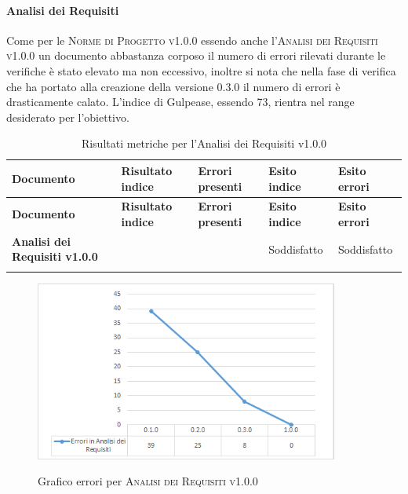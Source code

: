 \documentclass[../piano-di-qualifica.tex]{subfiles}
\begin{document}
\paragraph{Analisi dei Requisiti}
\label{sub:analisi_dei_requisiti}
Come per le \textsc{Norme di Progetto v1.0.0} essendo anche l'\textsc{Analisi dei Requisiti v1.0.0} un documento abbastanza corposo il numero di errori rilevati durante le verifiche è stato elevato ma non eccessivo, inoltre si nota che nella fase di verifica che ha portato alla creazione della versione 0.3.0 il numero di errori è drasticamente calato. 
L'indice di Gulpease, essendo 73, rientra nel range desiderato per l'obiettivo.

\renewcommand{\arraystretch}{2} %
\begin{longtable}[H]{>{\centering\bfseries}m{6cm} >{\centering}m{2cm} >{\centering}m{2.5cm} >{\centering}m{2.5cm} >{\centering\arraybackslash}m{2.5cm}}  
  \rowcolor{lightgray}
  {\textbf{Documento}} & {\textbf{Risultato indice}} & {\textbf{Errori presenti}} & {\textbf{Esito indice}} & {\textbf{Esito errori}}  \\
  \endfirsthead%
  \rowcolor{lightgray}
  {\textbf{Documento}} & {\textbf{Risultato indice}} & {\textbf{Errori presenti}} & {\textbf{Esito indice}} & {\textbf{Esito errori}}  \\
  \endhead%
  \textbf{Analisi dei Requisiti v1.0.0} & 73                 & 0               & Soddisfatto & Soddisfatto \\
  \caption{Risultati metriche per l'Analisi dei Requisiti v1.0.0}
  \label{tab:my-table}
\end{longtable}

    \begin{figure}[H]
        \centering
        \includegraphics[width=10cm]{img/erroriAnalisi.png}
        \label{fig:scice_documenti}
        \caption{Grafico errori per \textsc{Analisi dei Requisiti v1.0.0}}
    \end{figure}
\end{document}
